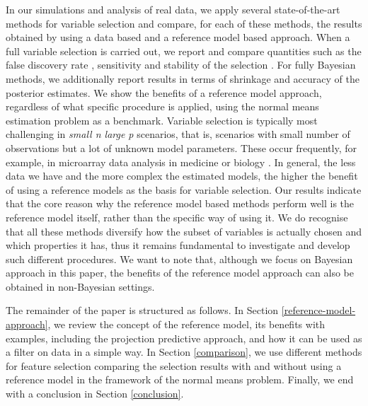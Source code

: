 \documentclass[american,]{article}
\theoremstyle{definition}
\begin{document}
In our simulations and analysis of real data, we apply several state-of-the-art methods for variable selection and compare,
for each of these methods, the results obtained by using a data based and a
reference model based approach. When a full 
variable selection is carried out, we report and compare quantities such as 
the false discovery rate \citep{paper:fdr_BH}, sensitivity and stability of the selection \citep{paper:stability}. For fully Bayesian methods, we additionally report results in terms of shrinkage and accuracy of the posterior estimates.
We show the benefits
of a reference model approach, regardless of what specific procedure is applied, using 
the normal means estimation problem as a benchmark. 
Variable selection is typically most challenging in 
\textit{small n large p} scenarios, that is, scenarios with small number of
observations but a lot of unknown model parameters. 
These occur frequently, for example, 
in microarray data analysis in medicine or biology \citep{dudoit2003multiple,liao2007logistic,paper:efron}.
In general, the less data we have and the more complex 
the estimated models, the higher the benefit of using a reference
models as the basis for variable selection.
Our results indicate that the core reason why the reference model based
methods perform well is the reference model itself, rather than the
specific way of using it. We do recognise that all these methods
diversify how the subset of variables is actually chosen and which
properties it has, thus it remains fundamental to investigate and
develop such different procedures. We want to note that, although we focus on
Bayesian approach in this paper, the benefits of the reference model 
approach can also be obtained in non-Bayesian settings.


The remainder of the paper is structured as follows. In Section \ref{reference-model-approach}, we review the concept of the reference model, its benefits with examples, including the projection predictive approach, and how it can be used as a filter on data in a simple way. In Section \ref{comparison}, we use different methods for feature selection comparing the selection results with and without using a reference model in the framework of the normal means problem. Finally, we end with a conclusion in Section \ref{conclusion}.
\end{document}
